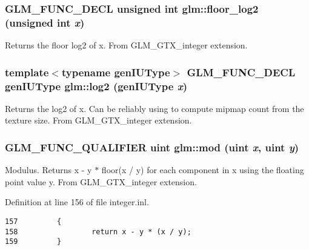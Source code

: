 \hypertarget{group__gtx__integer_g7011b4e1c1e1ed492149b028feacc00e}{
\subsubsection[floor\_\-log2]{\setlength{\rightskip}{0pt plus 5cm}GLM\_\-FUNC\_\-DECL unsigned int glm::floor\_\-log2 (unsigned int {\em x})}}
\label{group__gtx__integer_g7011b4e1c1e1ed492149b028feacc00e}


Returns the floor log2 of x. From GLM\_\-GTX\_\-integer extension. \hypertarget{group__gtx__integer_g43dcff81ada0f7d4a29b25ca2a0cef2f}{
\subsubsection[log2]{\setlength{\rightskip}{0pt plus 5cm}template$<$typename genIUType$>$ GLM\_\-FUNC\_\-DECL genIUType glm::log2 (genIUType {\em x})}}
\label{group__gtx__integer_g43dcff81ada0f7d4a29b25ca2a0cef2f}


Returns the log2 of x. Can be reliably using to compute mipmap count from the texture size. From GLM\_\-GTX\_\-integer extension. \hypertarget{group__gtx__integer_gb8f9ec0ca93ca90669434224818f0750}{
\subsubsection[mod]{\setlength{\rightskip}{0pt plus 5cm}GLM\_\-FUNC\_\-QUALIFIER uint glm::mod (uint {\em x}, \/  uint {\em y})}}
\label{group__gtx__integer_gb8f9ec0ca93ca90669434224818f0750}


Modulus. Returns x - y $\ast$ floor(x / y) for each component in x using the floating point value y. From GLM\_\-GTX\_\-integer extension. 

Definition at line 156 of file integer.inl.

\begin{Code}\begin{verbatim}157         {
158                 return x - y * (x / y);
159         }
\end{verbatim}
\end{Code}


